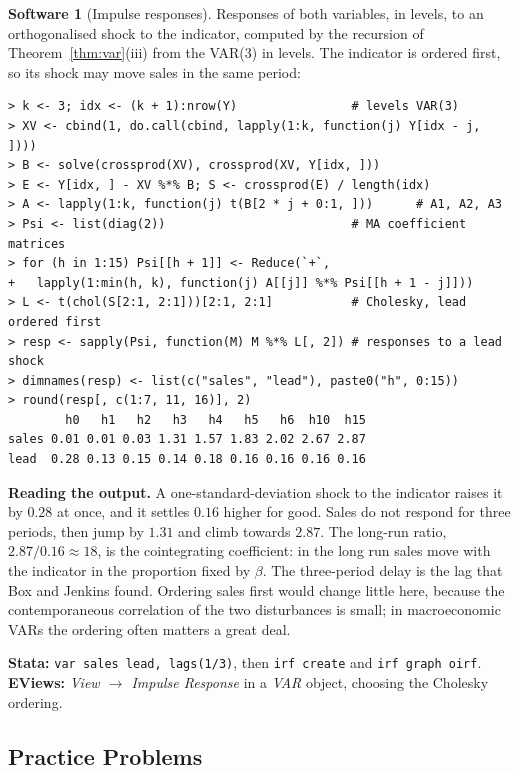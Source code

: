 \documentclass[11pt,a4paper]{article}
\numberwithin{equation}{section}
\theoremstyle{definition}
\newtheorem{software}[thm]{Software}
\begin{document}
\begin{software}[Impulse responses]
\label{sw:irf}
Responses of both variables, in levels, to an orthogonalised shock to the indicator, computed by the recursion of Theorem~\ref{thm:var}(iii) from the
VAR(3) in levels. The indicator is ordered first, so its shock may move sales in the same period:
{\small\begin{verbatim}
> k <- 3; idx <- (k + 1):nrow(Y)                # levels VAR(3)
> XV <- cbind(1, do.call(cbind, lapply(1:k, function(j) Y[idx - j, ])))
> B <- solve(crossprod(XV), crossprod(XV, Y[idx, ]))
> E <- Y[idx, ] - XV %*% B; S <- crossprod(E) / length(idx)
> A <- lapply(1:k, function(j) t(B[2 * j + 0:1, ]))      # A1, A2, A3
> Psi <- list(diag(2))                          # MA coefficient matrices
> for (h in 1:15) Psi[[h + 1]] <- Reduce(`+`,
+   lapply(1:min(h, k), function(j) A[[j]] %*% Psi[[h + 1 - j]]))
> L <- t(chol(S[2:1, 2:1]))[2:1, 2:1]           # Cholesky, lead ordered first
> resp <- sapply(Psi, function(M) M %*% L[, 2]) # responses to a lead shock
> dimnames(resp) <- list(c("sales", "lead"), paste0("h", 0:15))
> round(resp[, c(1:7, 11, 16)], 2)
        h0   h1   h2   h3   h4   h5   h6  h10  h15
sales 0.01 0.01 0.03 1.31 1.57 1.83 2.02 2.67 2.87
lead  0.28 0.13 0.15 0.14 0.18 0.16 0.16 0.16 0.16
\end{verbatim}}
\textbf{Reading the output.} A one-standard-deviation shock to the indicator raises it by $0.28$ at once, and it settles $0.16$ higher for good. Sales do not respond
for three periods, then jump by $1.31$ and climb towards $2.87$. The long-run ratio, $2.87/0.16 \approx 18$, is the cointegrating coefficient: in the long run sales move with
the indicator in the proportion fixed by $\beta$. The three-period delay is the lag that Box and Jenkins found. Ordering sales first would change little
here, because the contemporaneous correlation of the two disturbances is small; in macroeconomic VARs the ordering often matters a great deal.

\textbf{Stata:} \texttt{var sales lead, lags(1/3)}, then \texttt{irf create} and \texttt{irf graph oirf}. \textbf{EViews:} \emph{View $\to$ Impulse Response} in a
\emph{VAR} object, choosing the Cholesky ordering.
\end{software}

\subsection{Practice Problems}
\end{document}
